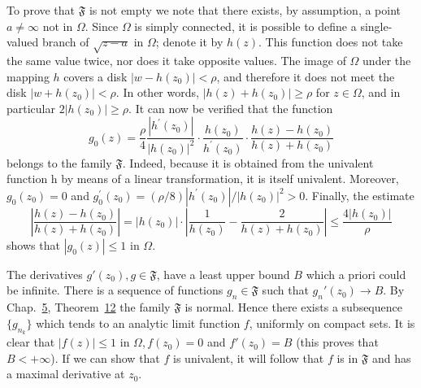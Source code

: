 To prove that $\mathfrak{F}$ is not empty we note that there exists, by assumption, a point $a \neq \infty$ not in $\Omega$. Since $\Omega$ is simply connected, it is possible to define a single-valued branch of $\sqrt{z - a}$ in $\Omega$; denote it by $h(z)$. This function does not take the same value twice, nor does it take opposite values. The image of $\Omega$ under the mapping $h$ covers a disk $|w - h(z_0)| < \rho$, and therefore it does not meet the disk $|w + h(z_0)| < \rho$. In other words, $|h(z) + h(z_0)| \geq \rho$ for $z \in \Omega$, and in particular $2|h(z_0)| \geq \rho$. It can now be verified that the function
\begin{equation*}
g _ {0} (z) = \frac {\rho}{4} \frac {| h ^ {\prime} (z _ {0}) |}{| h (z _ {0}) | ^ {2}} \cdot \frac {h (z _ {0})}{h ^ {\prime} (z _ {0})} \cdot \frac {h (z) - h (z _ {0})}{h (z) + h (z _ {0})}
\end{equation*}
belongs to the family $\mathfrak{F}$. Indeed, because it is obtained from the univalent function h by means of a linear transformation, it is itself univalent. Moreover, $g_{0}(z_{0}) = 0$ and $g_{0}^{\prime}(z_{0}) = (\rho/8)|h^{\prime}(z_{0})|/|h(z_{0})|^{2} > 0$. Finally, the estimate
\begin{equation*}
\left| \frac {h (z) - h \left(z _ {0}\right)}{h (z) + h \left(z _ {0}\right)} \right| = | h \left(z _ {0}\right) | \cdot \left| \frac {1}{h \left(z _ {0}\right)} - \frac {2}{h (z) + h \left(z _ {0}\right)} \right| \leqslant \frac {4 \left| h \left(z _ {0}\right) \right|}{\rho}
\end{equation*}
shows that $|g_0(z)| \leq 1$ in $\Omega$.

\begingroup\renewcommand{\thefootnote}{}\endgroup

The derivatives $g'(z_0), g \in \mathfrak{F}$, have a least upper bound $B$ which a priori could be infinite. There is a sequence of functions $g_n \in \mathfrak{F}$ such that $g_n'(z_0) \to B$. By Chap.~\hyperref[chap:5]{5}, Theorem~\hyperref[thm:5.12]{12} the family $\mathfrak{F}$ is normal. Hence there exists a subsequence $\{g_{n_k}\}$ which tends to an analytic limit function $f$, uniformly on compact sets. It is clear that $|f(z)| \leq 1$ in $\Omega, f(z_0) = 0$ and $f'(z_0) = B$ (this proves that $B < +\infty$). If we can show that $f$ is univalent, it will follow that $f$ is in $\mathfrak{F}$ and has a maximal derivative at $z_0$.

